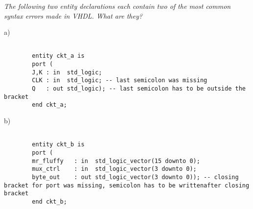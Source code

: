 \begin{my_num_list}
	\item \textit{The following two entity declarations each contain two of the most common syntax errors made in VHDL. What are they?}
	
	\noindent
	\begin{minipage}{1\linewidth}
		a)
		\begin{lstlisting}[]
		
		entity ckt_a is
		port (
		J,K : in  std_logic;
		CLK : in  std_logic; -- last semicolon was missing
		Q   : out std_logic); -- last semicolon has to be outside the bracket
		end ckt_a;
		\end{lstlisting}
	\end{minipage}
	
	\noindent
	\begin{minipage}{1\linewidth}
		b)
		\begin{lstlisting}[]
		
		entity ckt_b is
		port (
		mr_fluffy   : in  std_logic_vector(15 downto 0);
		mux_ctrl    : in  std_logic_vector(3 downto 0);
		byte_out    : out std_logic_vector(3 downto 0)); -- closing bracket for port was missing, semicolon has to be writtenafter closing bracket
		end ckt_b;
		\end{lstlisting}
	\end{minipage}	
		
\end{my_num_list}